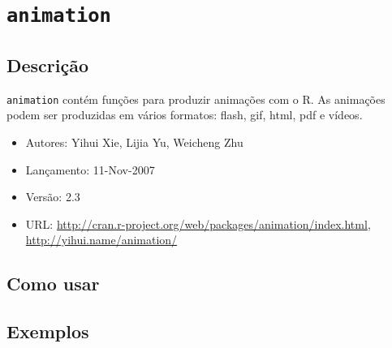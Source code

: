 \section{\texttt{animation}}


\subsection*{Descrição}

\begin{frame}

  \texttt{animation} contém funções para produzir
  animações com o R. As animações podem ser produzidas em vários
  formatos: flash, gif, html, pdf e vídeos.

  \begin{itemize}
    \itemsep1pt\parskip0pt
  \item Autores: Yihui Xie, Lijia Yu, Weicheng Zhu
  \item Lançamento: 11-Nov-2007
  \item Versão: 2.3
  \item URL:
    \url{http://cran.r-project.org/web/packages/animation/index.html},
    \url{http://yihui.name/animation/}
  \end{itemize}

\end{frame}


\subsection*{Como usar}

\begin{frame}



\end{frame}


\subsection*{Exemplos}

